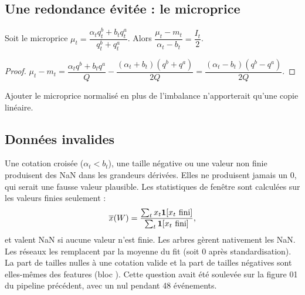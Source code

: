 \subsection{Une redondance évitée : le microprice}
\begin{lemme}
Soit le microprice $\mu_t=\dfrac{\alpha_tq^b_t+b_tq^a_t}{q^b_t+q^a_t}$. Alors $\dfrac{\mu_t-m_t}{\alpha_t-b_t}=\dfrac{I_t}{2}$.
\end{lemme}
\begin{proof}
$\mu_t-m_t=\dfrac{\alpha_tq^b+b_tq^a}{Q}-\dfrac{(\alpha_t+b_t)(q^b+q^a)}{2Q}=\dfrac{(\alpha_t-b_t)(q^b-q^a)}{2Q}$.
\end{proof}
\noindent Ajouter le microprice normalisé en plus de l'imbalance n'apporterait qu'une copie linéaire.

\subsection{Données invalides}
Une cotation croisée ($\alpha_t<b_t$), une taille négative ou une valeur non finie produisent des NaN dans les grandeurs dérivées. Elles ne produisent jamais un 0, qui serait une fausse valeur plausible. Les statistiques de fenêtre sont calculées sur les valeurs finies seulement :
\begin{equation}
\overline{x}(W)=\frac{\sum_t x_t\ind{x_t\ \text{fini}}}{\sum_t\ind{x_t\ \text{fini}}},
\end{equation}
et valent NaN si aucune valeur n'est finie. Les arbres gèrent nativement les NaN. Les réseaux les remplacent par la moyenne du fit (soit 0 après standardisation). La part de tailles nulles à une cotation valide et la part de tailles négatives sont elles-mêmes des features (bloc ). Cette question avait été soulevée sur la figure 01 du pipeline précédent, avec un  nul pendant 48 événements.
